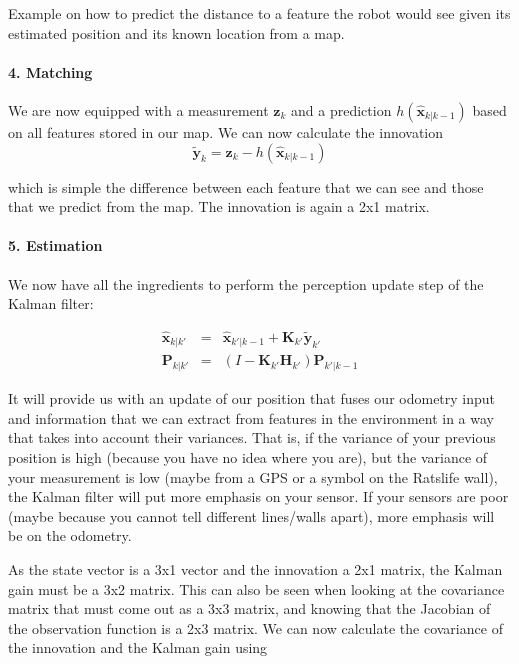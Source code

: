 \begin{framed}
Example on how to predict the distance to a feature the robot would see given its estimated position and its known location from a map.
\end{framed}

\paragraph{4. Matching}
We are now equipped with a measurement $ \boldsymbol{z}_k$ and a prediction $ h(\hat{\boldsymbol{x}}_{k|k-1})$ based on all features stored in our map. We can now calculate the innovation
\begin{equation}
\tilde{\boldsymbol{y}}_{k}=\boldsymbol{z}_{k}-h(\hat{\boldsymbol{x}}_{k|k-1})
\end{equation}

which is simple the difference between each feature that we can see and those that we predict from the map. The innovation is again a 2x1 matrix.

\paragraph{5. Estimation}
We now have all the ingredients to perform the perception update step of the Kalman filter:

\begin{eqnarray}
\hat{\boldsymbol{x}}_{k|k'} &=& \hat{\boldsymbol{x}}_{k'|k-1} + \boldsymbol{K}_{k'}\tilde{\boldsymbol{y}}_{k'}\\
\boldsymbol{P}_{k|k'} &=& (I - \boldsymbol{K}_{k'} {\boldsymbol{H}_{k'}}) \boldsymbol{P}_{k'|k-1}
\end{eqnarray}

It will provide us with an update of our position that fuses our odometry input and information  that we can extract from features in the environment in a way that takes into account their variances. That is, if the variance of your previous position is high (because you have no idea where you are), but the variance of your measurement is low (maybe from a GPS or a symbol on the Ratslife wall), the Kalman filter will put more emphasis on your sensor. If your sensors are poor (maybe because you cannot tell different lines/walls apart), more emphasis will be on the odometry.

As the state vector is a 3x1 vector and the innovation a 2x1 matrix, the Kalman gain must be a 3x2 matrix. This can also be seen when looking at the covariance matrix that must come out as a 3x3 matrix, and knowing that the Jacobian of the observation function is a 2x3 matrix. We can now calculate the covariance of the innovation and the Kalman gain using

